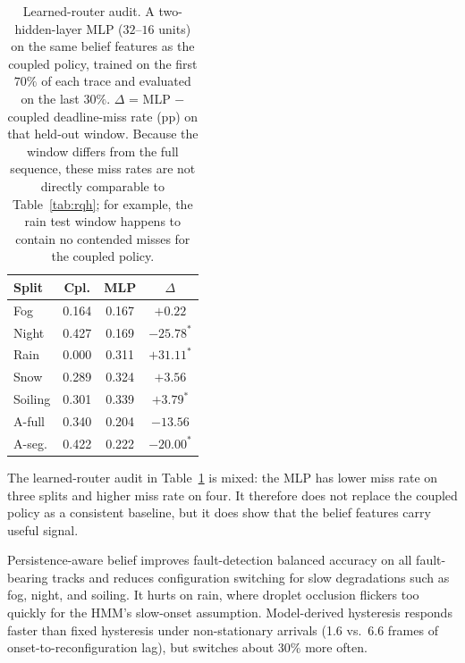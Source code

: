 \documentclass[conference]{IEEEtran}
\begin{document}
\begin{table}[t]
\caption{Learned-router audit. A two-hidden-layer MLP ($32$--$16$
units) on the same belief features as the coupled policy, trained on
the first $70\%$ of each trace and evaluated on the last $30\%$.
$\Delta$ = MLP $-$ coupled deadline-miss rate (pp) on that held-out
window. Because the window differs from the full sequence, these
miss rates are not directly comparable to Table~\ref{tab:rqh}; for
example, the rain test window happens to contain no contended misses
for the coupled policy.}
\label{tab:mlp}
\centering
\scriptsize
\setlength{\tabcolsep}{3pt}
\begin{tabular}{lccc}
\toprule
\textbf{Split} & \textbf{Cpl.} & \textbf{MLP} & \textbf{$\Delta$} \\
\midrule
Fog      & 0.164 & 0.167 & $+0.22$ \\
Night    & 0.427 & 0.169 & $-25.78^\ast$ \\
Rain     & 0.000 & 0.311 & $+31.11^\ast$ \\
Snow     & 0.289 & 0.324 & $+3.56$ \\
Soiling  & 0.301 & 0.339 & $+3.79^\ast$ \\
A-full   & 0.340 & 0.204 & $-13.56$ \\
A-seg.   & 0.422 & 0.222 & $-20.00^\ast$ \\
\bottomrule
\end{tabular}
\end{table}

The learned-router audit in Table~\ref{tab:mlp} is mixed: the MLP
has lower miss rate on three splits and higher miss rate on four.
It therefore does not replace the coupled policy as a consistent
baseline, but it does show that the belief features carry useful
signal.

Persistence-aware belief improves fault-detection balanced accuracy
on all fault-bearing tracks and reduces configuration switching for
slow degradations such as fog, night, and soiling. It hurts on rain,
where droplet occlusion flickers too quickly for the HMM's
slow-onset assumption. Model-derived hysteresis responds faster than
fixed hysteresis under non-stationary arrivals (1.6 vs.\ 6.6 frames
of onset-to-reconfiguration lag), but switches about 30\% more often.
\end{document}

